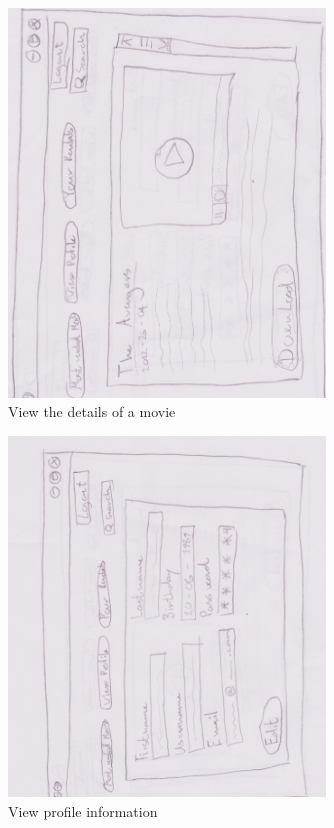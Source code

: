 \begin{figure}[!ht]
  \centering
    \includegraphics[width=0.75\textwidth]{Parts/Appendix/Images/PaperMockup/ViewMovie}
  \caption{View the details of a movie}
  \label{fig:Appendix_GUI_sketches_ViewMovie}
\end{figure}

\begin{figure}[!ht]
  \centering
    \includegraphics[width=0.75\textwidth]{Parts/Appendix/Images/PaperMockup/ViewProfile}
  \caption{View profile information}
  \label{fig:Appendix_GUI_sketches_ViewProfile}
\end{figure}

